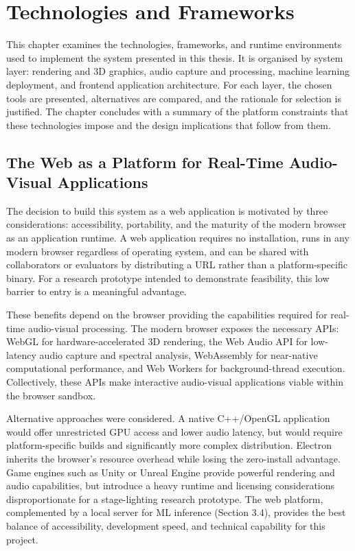 \chapter{Technologies and Frameworks}
\label{chap:technologies-frameworks}

This chapter examines the technologies, frameworks, and runtime environments used to implement the system presented in this thesis. It is organised by system layer: rendering and 3D graphics, audio capture and processing, machine learning deployment, and frontend application architecture. For each layer, the chosen tools are presented, alternatives are compared, and the rationale for selection is justified. The chapter concludes with a summary of the platform constraints that these technologies impose and the design implications that follow from them.

\section{The Web as a Platform for Real-Time Audio-Visual Applications}

The decision to build this system as a web application is motivated by three considerations: accessibility, portability, and the maturity of the modern browser as an application runtime. A web application requires no installation, runs in any modern browser regardless of operating system, and can be shared with collaborators or evaluators by distributing a URL rather than a platform-specific binary. For a research prototype intended to demonstrate feasibility, this low barrier to entry is a meaningful advantage.

These benefits depend on the browser providing the capabilities required for real-time audio-visual processing. The modern browser exposes the necessary APIs: WebGL for hardware-accelerated 3D rendering, the Web Audio API for low-latency audio capture and spectral analysis, WebAssembly for near-native computational performance, and Web Workers for background-thread execution. Collectively, these APIs make interactive audio-visual applications viable within the browser sandbox.

Alternative approaches were considered. A native C++/OpenGL application would offer unrestricted GPU access and lower audio latency, but would require platform-specific builds and significantly more complex distribution. Electron inherits the browser's resource overhead while losing the zero-install advantage. Game engines such as Unity or Unreal Engine provide powerful rendering and audio capabilities, but introduce a heavy runtime and licensing considerations disproportionate for a stage-lighting research prototype. The web platform, complemented by a local server for ML inference (Section 3.4), provides the best balance of accessibility, development speed, and technical capability for this project.

